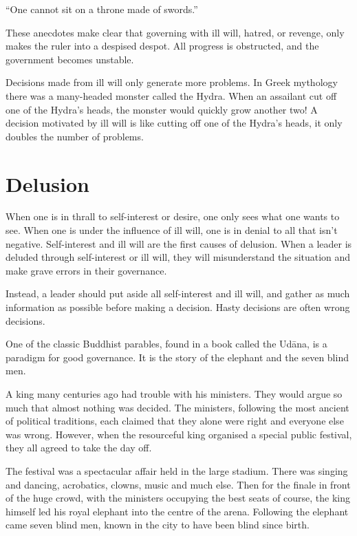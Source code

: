 ﻿\documentclass[11pt, openany]{book}
\begin{document}
“One cannot sit on a throne made of swords.”

These anecdotes make clear that governing with ill will, hatred, or revenge, only makes the ruler into a despised despot. All progress is obstructed, and the government becomes unstable.

Decisions made from ill will only generate more problems. In Greek mythology there was a many-headed monster called the Hydra. When an assailant cut off one of the Hydra’s heads, the monster would quickly grow another two! A decision motivated by ill will is like cutting off one of the Hydra’s heads, it only doubles the number of problems.

\section{Delusion}

When one is in thrall to self-interest or desire, one only sees what one wants to see. When one is under the influence of ill will, one is in denial to all that isn’t negative. Self-interest and ill will are the first causes of delusion. When a leader is deluded through self-interest or ill will, they will misunderstand the situation and make grave errors in their governance.

Instead, a leader should put aside all self-interest and ill will, and gather as much information as possible before making a decision. Hasty decisions are often wrong decisions.

One of the classic Buddhist parables, found in a book called the Udāna, is a paradigm for good governance. It is the story of the elephant and the seven blind men.

A king many centuries ago had trouble with his ministers. They would argue so much that almost nothing was decided. The ministers, following the most ancient of political traditions, each claimed that they alone were right and everyone else was wrong. However, when the resourceful king organised a special public festival, they all agreed to take the day off.

The festival was a spectacular affair held in the large stadium. There was singing and dancing, acrobatics, clowns, music and much else. Then for the finale in front of the huge crowd, with the ministers occupying the best seats of course, the king himself led his royal elephant into the centre of the arena. Following the elephant came seven blind men, known in the city to have been blind since birth.
\end{document}
